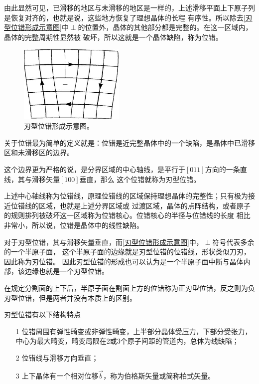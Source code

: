                 由此显然可见，已滑移的地区与未滑移的地区是一样的，上述滑移平面上下原子列是恢复对齐的，也就是说，这些地方恢复了理想晶体的长程
                有序性。所以除去\autoref{刃型位错形成示意图}中$\perp$的位置外，晶体的其他部分都是完整的。在这一区域内，晶体的完整周期性显然被
                破坏，所以这就是一个晶体缺陷，称为位错。
                \begin{figure}[ht]
                    \centering
                    \includegraphics[width=0.45\textwidth]{fig/刃型位错示意图b.eps}
                    \caption{刃型位错形成示意图。}
                    \label{刃型位错形成示意图}
                \end{figure}

                关于位错最为简单的定义就是：位错是近完整晶体中的一个缺陷，是晶体中已滑移区和未滑移区的边界。
                
                这个边界更为严格的说，是分界区域的中心轴线，是平行于$[011]$方向的一条直线，其与滑移矢量$[100]$垂直，那么
                这个位错就称为刃型位错。

                上述中心轴线称为位错线，原理位错线的区域保持理想晶体的完整性；只有极为接近位错线的区域，也就是上述分界区域或
                过渡区域，晶体的点阵结构，或者原子的规则排列被破坏这一区域称为位错核心。位错核心的半径与位错线的长度
                相比非常小，所以说，位错是晶体中的线性缺陷。

                对于刃型位错，其与滑移矢量垂直，而\autoref{刃型位错形成示意图}中，$\perp$符号代表多余的一个半原子面，
                这个半原子面的边缘就是刃型位错的位错线，形状类似刀刃，因此称为刃位错。
                因此刃型位错的形成也可以认为是一个半原子面中断与晶体内部，该边缘也就是一个刃型位错。

                在规定分割面的上下后，半原子面在割面上方的位错称为正刃型位错，反之则为负刃型位错，但是两者并没有本质上的区别。

                刃型位错有以下结构特点
                \begin{itemize}
                    \item[1] 位错周围有弹性畸变或非弹性畸变，上半部分晶体受压力，下部分受张力，中心为最大畸变，畸变局限在2或3个原子间距的管道内，总体为线缺陷；
                    \item[2] 位错线与滑移方向垂直；
                    \item[3] 上下晶体有一个相对位移$\vec{b}$，称为伯格斯矢量或简称柏式矢量。
                \end{itemize}
